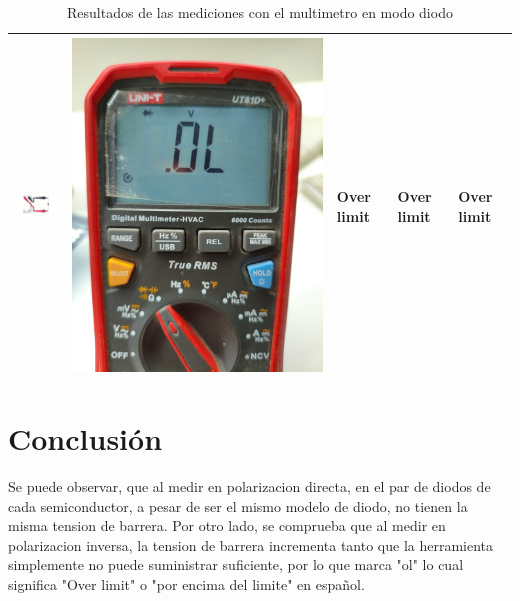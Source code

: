 \documentclass[chaptersright]{informeutn}
\begin{document}
\begin{center}
\begin{table}[h!]
\begin{tabular}{|m{4cm}|>{\centering}m{2cm}|>{\centering}m{2cm}|>{\centering}m{2cm}|>{\centering\arraybackslash}m{2cm}|}
  \hline
  \includegraphics[width=3.5cm]{pictures/polaridad_multimetro2.png} & \includegraphics[width=\linewidth]{pictures/multimetro_silicio_inversa.jpeg}
  & Over limit & Over limit & Over limit  \\
  \hline
  \end{tabular}
  \caption{Resultados de las mediciones con el multimetro en modo diodo}
  \end{table}
  \end{center}

  \section{Conclusión}

  Se puede observar, que al medir en polarizacion directa, en el par de diodos de cada semiconductor, a pesar de ser el
  mismo modelo de diodo, no tienen la misma tension de barrera. Por otro lado, se comprueba que al medir en polarizacion
  inversa, la tension de barrera incrementa tanto que la herramienta simplemente no puede suministrar suficiente, por
  lo que marca "ol" lo cual significa "Over limit" o "por encima del limite" en español.
\end{document}
